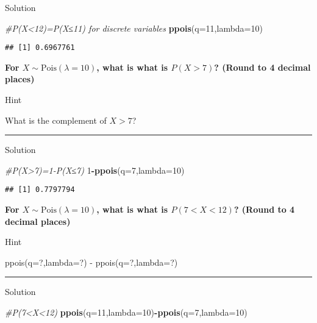\documentclass[
]{book}
\newenvironment{Shaded}{\begin{snugshade}}{\end{snugshade}}
\newcommand{\AttributeTok}[1]{\textcolor[rgb]{0.13,0.29,0.53}{#1}}
\newcommand{\CommentTok}[1]{\textcolor[rgb]{0.56,0.35,0.01}{\textit{#1}}}
\newcommand{\DecValTok}[1]{\textcolor[rgb]{0.00,0.00,0.81}{#1}}
\newcommand{\FunctionTok}[1]{\textcolor[rgb]{0.13,0.29,0.53}{\textbf{#1}}}
\newcommand{\NormalTok}[1]{#1}
\newcommand{\SpecialCharTok}[1]{\textcolor[rgb]{0.81,0.36,0.00}{\textbf{#1}}}
\begin{document}
Solution

\begin{Shaded}
\begin{Highlighting}[]
\CommentTok{\#P(X\textless{}12)=P(X≤11) for discrete variables}
\FunctionTok{ppois}\NormalTok{(}\AttributeTok{q=}\DecValTok{11}\NormalTok{,}\AttributeTok{lambda=}\DecValTok{10}\NormalTok{)}
\end{Highlighting}
\end{Shaded}

\begin{verbatim}
## [1] 0.6967761
\end{verbatim}

\textbf{For \(X\sim \mbox{Pois}(\lambda=10)\), what is what is \(P(X>7)\)? (Round to 4 decimal places)}

Hint

What is the complement of \(X>7\)?

\begin{center}\rule{0.5\linewidth}{0.5pt}\end{center}

Solution

\begin{Shaded}
\begin{Highlighting}[]
\CommentTok{\#P(X\textgreater{}7)=1{-}P(X≤7)}
\DecValTok{1}\SpecialCharTok{{-}}\FunctionTok{ppois}\NormalTok{(}\AttributeTok{q=}\DecValTok{7}\NormalTok{,}\AttributeTok{lambda=}\DecValTok{10}\NormalTok{)}
\end{Highlighting}
\end{Shaded}

\begin{verbatim}
## [1] 0.7797794
\end{verbatim}

\textbf{For \(X\sim \mbox{Pois}(\lambda=10)\), what is what is \(P(7<X<12)\)? (Round to 4 decimal places)}

Hint

ppois(q=?,lambda=?) - ppois(q=?,lambda=?)

\begin{center}\rule{0.5\linewidth}{0.5pt}\end{center}

Solution

\begin{Shaded}
\begin{Highlighting}[]
\CommentTok{\#P(7\textless{}X\textless{}12)}
\FunctionTok{ppois}\NormalTok{(}\AttributeTok{q=}\DecValTok{11}\NormalTok{,}\AttributeTok{lambda=}\DecValTok{10}\NormalTok{)}\SpecialCharTok{{-}}\FunctionTok{ppois}\NormalTok{(}\AttributeTok{q=}\DecValTok{7}\NormalTok{,}\AttributeTok{lambda=}\DecValTok{10}\NormalTok{)}
\end{Highlighting}
\end{Shaded}
\end{document}
